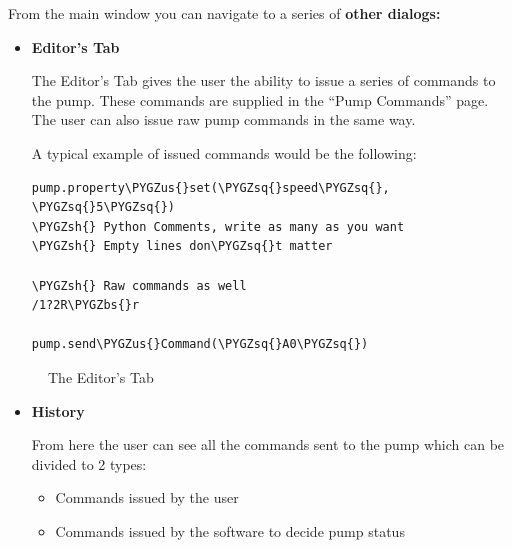 \documentclass[letterpaper,10pt,english]{sphinxmanual}
\def\PYGZbs{\char`\\}
\def\PYGZus{\char`\_}
\def\PYGZsh{\char`\#}
\def\PYGZsq{\char`\'}
\begin{document}
From the main window you can navigate to a series of \textbf{other dialogs:}
\begin{itemize}
\item {} 
\textbf{Editor's Tab}

The Editor's Tab gives the user the ability to issue a series of commands to the pump.
These commands are supplied in the ``Pump Commands'' page. The user can also issue raw
pump commands in the same way.

A typical example of issued commands would be the following:

\begin{Verbatim}[commandchars=\\\{\}]
pump.property\PYGZus{}set(\PYGZsq{}speed\PYGZsq{}, \PYGZsq{}5\PYGZsq{})
\PYGZsh{} Python Comments, write as many as you want
\PYGZsh{} Empty lines don\PYGZsq{}t matter

\PYGZsh{} Raw commands as well
/1?2R\PYGZbs{}r

pump.send\PYGZus{}Command(\PYGZsq{}A0\PYGZsq{})
\end{Verbatim}

\end{itemize}
\begin{figure}[htbp]
\centering
\capstart

\caption{The Editor's Tab}\end{figure}
\begin{itemize}
\item {} 
\textbf{History}

From here the user can see all the commands sent to the pump which can be divided to 2 types:
\begin{itemize}
\item {} 
Commands issued by the user

\item {} 
Commands issued by the software to decide pump status

\end{itemize}

\end{itemize}
\end{document}
